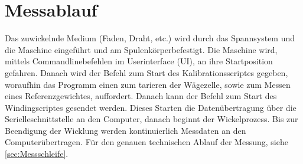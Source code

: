 \section{Messablauf}
\label{sec:Messablauf}



Das zuwickelnde Medium (Faden, Draht, etc.) wird durch das Spannsystem und die Maschine eingeführt und am Spulenkörperbefestigt. Die Maschine wird, mittels Commandlinebefehlen im Userinterface (UI), an ihre Startposition gefahren. Danach wird der Befehl zum Start des Kalibrationsscriptes gegeben, woraufhin das Programm einen zum tarieren der Wägezelle, sowie zum Messen eines Referenzgewichtes, auffordert. Danach kann der Befehl zum Start des Windingscriptes gesendet werden. Dieses Starten die Datenübertragung über die Serielleschnittstelle an den Computer, danach beginnt der Wickelprozess. Bis zur Beendigung der Wicklung werden kontinuierlich Messdaten an den Computerübertragen. Für den genauen technischen Ablauf der Messung, siehe \autoref{sec:Messschleife}. 
